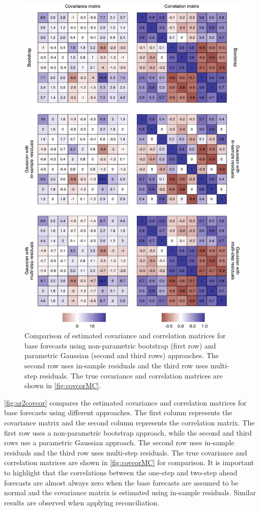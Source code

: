 \documentclass[a4paper,11pt]{article}
\theoremstyle{definition}
\begin{document}
\begin{figure}[p]
	\centering
	\includegraphics[width = 0.9\linewidth]{fig/simAR/base_cov.pdf}
	\caption{Comparison of estimated covariance and correlation matrices for base forecasts using non-parametric bootstrap (first row) and parametric Gaussian (second and third rows) approaches. The second row uses in-sample residuals and the third row uses multi-step residuals. The true covariance and correlation matrices are shown in \autoref{fig:covcorMC}.}
	\label{fig:ar2covcor}
\end{figure}

\autoref{fig:ar2covcor} compares the estimated covariance and correlation matrices for base forecasts using different approaches. The first column represents the covariance matrix and the second column represents the correlation matrix. The first row uses a non-parametric bootstrap approach, while the second and third rows use a parametric Gaussian approach. The second row uses in-sample residuals and the third row uses multi-step residuals. The true covariance and correlation matrices are shown in \autoref{fig:covcorMC} for comparison. It is important to highlight that the correlations between the one-step and two-step ahead forecasts are almost always zero when the base forecasts are assumed to be normal and the covariance matrix is estimated using in-sample residuals. Similar results are observed when applying reconciliation.
\end{document}
